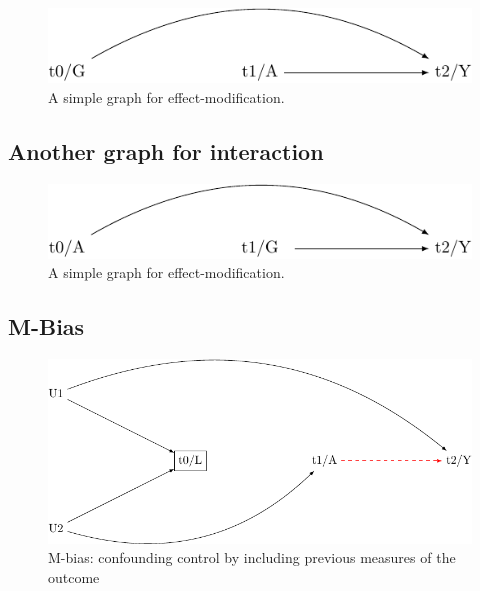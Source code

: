 \documentclass[
  singlecolumn]{report}
\begin{document}
\begin{figure}

{\centering \includegraphics[width=1\textwidth,height=\textheight]{causal-dags_files/figure-pdf/fig-dag-effect-modfication-1.pdf}

}

\caption{\label{fig-dag-effect-modfication}A simple graph for
effect-modification.}

\end{figure}

\hypertarget{another-graph-for-interaction}{%
\subsection{Another graph for
interaction}\label{another-graph-for-interaction}}

\begin{figure}

{\centering \includegraphics[width=1\textwidth,height=\textheight]{causal-dags_files/figure-pdf/fig-dag-effect-modfication-2-1.pdf}

}

\caption{\label{fig-dag-effect-modfication-2}A simple graph for
effect-modification.}

\end{figure}

\hypertarget{m-bias}{%
\subsection{M-Bias}\label{m-bias}}

\begin{figure}

{\centering \includegraphics[width=1\textwidth,height=\textheight]{causal-dags_files/figure-pdf/fig-m-bias-1.pdf}

}

\caption{\label{fig-m-bias}M-bias: confounding control by including
previous measures of the outcome}

\end{figure}
\end{document}
